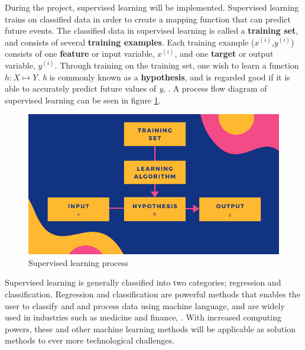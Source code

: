 During the project, supervised learning will be implemented. Supervised learning trains on classified data in order to create a mapping function that can predict future events. The classified data in supervised learning is called a \textbf{training set}, and consists of several \textbf{training examples}. Each training example ($x^{(i)}$,$y^{(i)}$) consists of one \textbf{feature} or input variable, \emph{$x^{(i)}$}, and one \textbf{target} or output variable, \emph{$y^{(i)}$}. Through training on the training set, one wish to learn a function $h : X \mapsto Y$. \emph{h} is commonly known as a \textbf{hypothesis}, and is regarded good if it is able to accurately predict future values of \emph{y}, \citep{Supervised}. A process flow diagram of supervised learning can be seen in figure \ref{fig:supervised}.

\begin{figure}[h!]
\centering
\includegraphics[scale=0.5]{Images/1_introduction/SUPERVISED LEARNING.png}
\caption{Supervised learning process}
\label{fig:supervised}
\end{figure}

Supervised learning is generally classified into two categories; regression and classification. Regression and classification are powerful methods that enables the user to classify and and process data using machine language, and are widely used in industries  such as medicine and finance, \citep{SupMet}. With increased computing powers, these and other machine learning methods will be applicable as solution methods to ever more technological challenges.  

    
